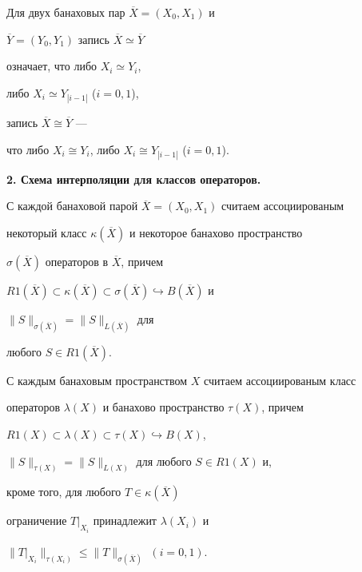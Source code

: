Для двух банаховых пар $\overline X = (X_0,X_1)$ и 


$\overline Y = (Y_0,Y_1)$ запись $\overline X \simeq \overline Y$ 


означает, что либо $X_i \simeq Y_i$,  


либо $X_i \simeq Y_{|i-1|}$ ($i=0,1$), 


запись $\overline X \cong \overline Y$ --- 


что либо $X_i \cong Y_i$, либо $X_i \cong Y_{|i-1|}$ ($i=0,1$). 


\medskip





{\bf 2. Схема интерполяции для классов операторов.}


С каждой банаховой парой $\overline X =(X_0,X_1)$ считаем ассоциированым


некоторый класс $\kappa (\overline X)$ и некоторое банахово пространство


$\sigma (\overline X)$ операторов в $\overline X$, причем


$R1(\overline X) \subset \kappa (\overline X) \subset


\sigma (\overline X) \hookrightarrow B(\overline X)$ и


$\| S \| _{\sigma (\overline X)}= \| S \| _{L(\overline X)}$ для


любого $S \in R1(\overline X)$.


С каждым банаховым пространством $X$ считаем ассоциированым класс


операторов $\lambda (X)$ и банахово пространство $\tau (X)$, причем 


$R1(X) \subset \lambda (X) \subset \tau (X) \hookrightarrow B(X)$,


$\| S \| _{\tau (X)} = \| S \| _{L(X)}$ для любого $S \in R1(X)$ и,


кроме того, для любого $T \in \kappa (\overline X)$


ограничение $T | _{X_i}$ принадлежит $\lambda (X_i)$ и


$\| T | _{X_i} \| _{ \tau (X_i)} \le


\| T \| _{\sigma (\overline X)}$ $(i=0,1)$.





